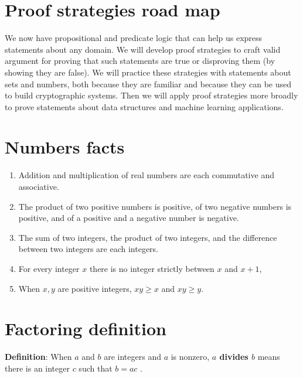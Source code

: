 \documentclass[12pt, oneside]{article}
\begin{document}
\vfill
\vfill \vfill
\section*{Proof strategies road map}


We now have propositional and predicate logic that can help us express 
statements about any domain. We will develop proof strategies to 
craft valid argument for proving that such statements are true or disproving
them (by showing they are false). We will practice these strategies with 
statements about sets and numbers, both because they are familiar and because they
can be used to build cryptographic systems. Then we will apply proof strategies
more broadly to prove statements about data structures and machine learning 
applications. \vfill
\section*{Numbers facts}


\begin{enumerate}
    \item Addition and multiplication of real 
    numbers are each commutative and associative. 
    \vspace{25pt}
    \item The product of two positive numbers is positive, of 
    two negative numbers is positive, and of a positive and a negative number is negative.
    \vspace{25pt}
    \item The sum of two integers, the product of two integers, and the 
    difference between two integers are each integers.
    \vspace{25pt}
    \item For every integer $x$ there is no integer strictly between $x$ and $x+1$, 
    \vspace{25pt}
    \item When $x, y$ are positive integers, $xy \geq x$ and $xy \geq y$.
    \vspace{25pt}
\end{enumerate}
 \vfill
\section*{Factoring definition}


{\bf Definition}: When $a$ and $b$ are integers and $a$ is nonzero, 
{\bf $a$ divides $b$} means there is an integer $c$ such that $b = ac$ . 
\end{document}
